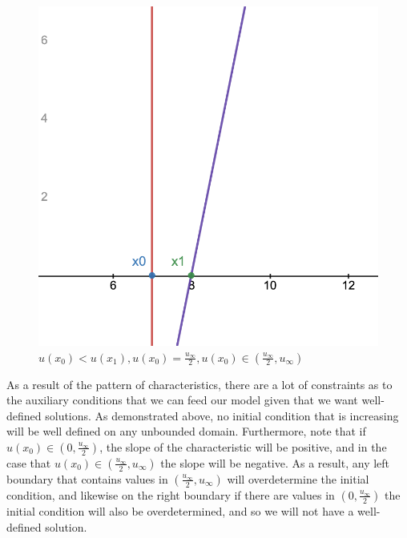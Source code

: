 \documentclass[12pt]{article}
\begin{document}
\begin{figure}[!htb]
    \caption{$u(x_0) > u(x_1), u(x_0), u(x_1) \in (\frac{u_\infty}{2}, u_\infty)$}\label{fig:no_shock_x1_x2_gt_half}
    \endminipage\hfill
    \includegraphics[width=\linewidth]{figures/no_shock_x0_eq_half.png}
    \caption{$u(x_0) < u(x_1), u(x_0) = \frac{u_\infty}{2},  u(x_0) \in (\frac{u_\infty}{2}, u_\infty) $}\label{fig:no_shock_x0_eq_half}
    \endminipage
\end{figure}

As a result of the pattern of characteristics, there are a lot of constraints as to the auxiliary conditions that we can feed our model given that we want well-defined solutions. As demonstrated above, no initial condition that is increasing will be well defined on any unbounded domain. Furthermore, note that if $u(x_0) \in (0, \frac{u_\infty}{2} )$, the slope of the characteristic will be positive, and in the case that $u(x_0) \in ( \frac{u_\infty}{2}, u_\infty )$ the slope will be negative. As a result, any left boundary that contains values in $( \frac{u_\infty}{2}, u_\infty )$ will overdetermine the initial condition, and likewise on the right boundary if there are values in $(0, \frac{u_\infty}{2} )$ the initial condition will also be overdetermined, and so we will not have a well-defined solution. 

%
%
%
\end{document}
